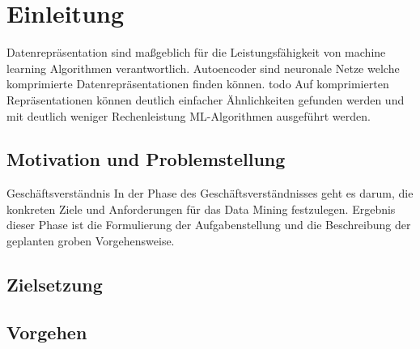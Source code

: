 \listoftodos


 
\chapter{Einleitung}
\label{chap:Einleitung}
	Datenrepräsentation sind maßgeblich für die Leistungsfähigkeit von machine learning Algorithmen verantwortlich. Autoencoder sind neuronale Netze welche komprimierte Datenrepräsentationen finden können. todo Auf komprimierten Repräsentationen können deutlich einfacher Ähnlichkeiten gefunden werden  und mit deutlich weniger Rechenleistung ML-Algorithmen ausgeführt werden.
  

	\section{Motivation und Problemstellung}
	\label{sec:MotivationUndProblemstellung}

	Geschäftsverständnis
	In der Phase des Geschäftsverständnisses geht es darum, die konkreten Ziele und Anforderungen für das Data Mining festzulegen. Ergebnis dieser Phase ist die Formulierung der Aufgabenstellung und die Beschreibung der geplanten groben Vorgehensweise.
	

	\section{Zielsetzung}
	\label{sec:Zielsetzung}

	\section{Vorgehen}
	\label{sec:Vorgehen}



